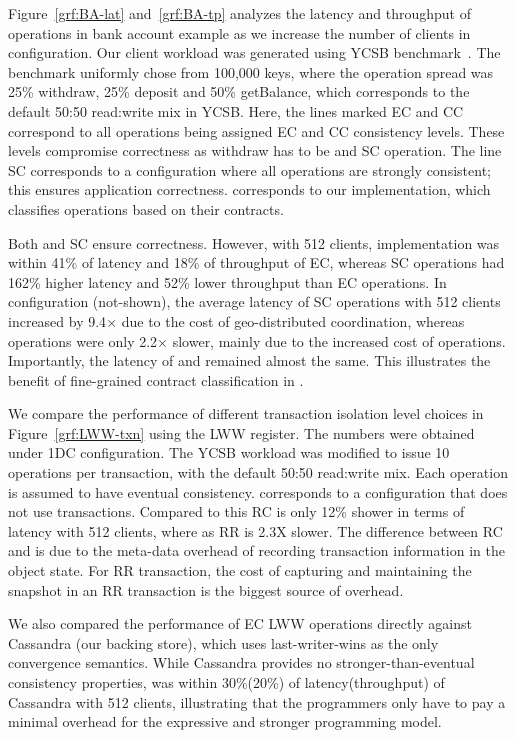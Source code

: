 Figure~\ref{grf:BA-lat} and~\ref{grf:BA-tp} analyzes the latency and throughput
of operations in bank account example as we increase the number of clients in
 configuration. Our client workload was generated using YCSB
benchmark~\cite{}. The benchmark uniformly chose from 100,000 keys, where the
operation spread was 25\% withdraw, 25\% deposit and 50\% getBalance, which
corresponds to the default 50:50 read:write mix in YCSB. Here, the lines marked
EC and CC correspond to all operations being assigned EC and CC consistency
levels. These levels compromise correctness as withdraw has to be and SC
operation. The line SC corresponds to a configuration where all operations are
strongly consistent; this ensures application correctness. \name corresponds to
our implementation, which classifies operations based on their contracts.

Both \name and SC ensure correctness. However, with 512 clients, \name
implementation was within 41\% of latency and 18\% of throughput of EC, whereas
SC operations had 162\% higher latency and 52\% lower throughput than EC
operations. In  configuration (not-shown), the average latency of SC
operations with 512 clients increased by 9.4$\times$ due to the cost of
geo-distributed coordination, whereas \name operations were only 2.2$\times$
slower, mainly due to the increased cost of  operations.
Importantly, the latency of  and  remained almost
the same. This illustrates the benefit of fine-grained contract classification
in \name.

We compare the performance of different transaction isolation level choices in
Figure~\ref{grf:LWW-txn} using the LWW register. The numbers were obtained
under 1DC configuration. The YCSB workload was modified to issue 10 operations
per transaction, with the default 50:50 read:write mix. Each operation is
assumed to have eventual consistency.  corresponds to a configuration
that does not use transactions. Compared to this RC is only 12\% shower in
terms of latency with 512 clients, where as RR is 2.3X slower. The difference
between RC and  is due to the meta-data overhead of recording
transaction information in the object state. For RR transaction, the cost of
capturing and maintaining the snapshot in an RR transaction is the biggest
source of overhead.

We also compared the performance of EC LWW operations directly against
Cassandra (our backing store), which uses last-writer-wins as the only
convergence semantics. While Cassandra provides no stronger-than-eventual
consistency properties, \name was within 30\%(20\%) of latency(throughput) of
Cassandra with 512 clients, illustrating that the programmers only have to pay
a minimal overhead for the expressive and stronger \name programming model.

